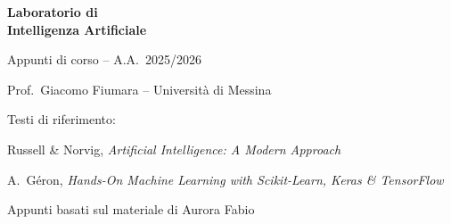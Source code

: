 \documentclass[a4paper,11pt]{report}
\begin{document}
\begin{titlepage}
\centering
\vspace*{3cm}
{\Huge\bfseries\color{MidnightBlue} Laboratorio di\\[6pt] Intelligenza Artificiale\par}
\vspace{1.5cm}
{\Large\color{NavyBlue} Appunti di corso -- A.A.\ 2025/2026\par}
\vspace{1cm}
{\large Prof.\ Giacomo Fiumara -- Universit\`a di Messina\par}
\vspace{0.5cm}
{\normalsize Testi di riferimento:\par}
{\small Russell \& Norvig, \emph{Artificial Intelligence: A Modern Approach}\par}
{\small A.\ G\'eron, \emph{Hands-On Machine Learning with Scikit-Learn, Keras \& TensorFlow}\par}
{\small Appunti basati sul materiale di Aurora Fabio\par}
\end{titlepage}

\tableofcontents
\newpage













\appendix
\end{document}
